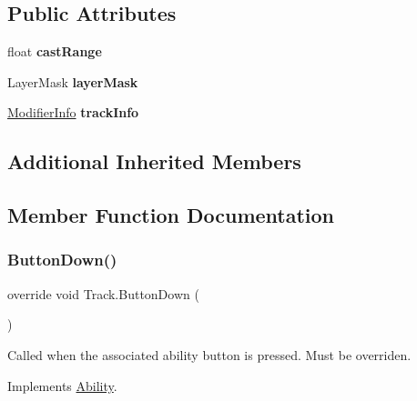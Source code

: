 \subsection*{Public Attributes}
\begin{DoxyCompactItemize}
\item 
\hypertarget{class_track_a17804c52c91aeb0228e837b6e31c950d}{}\label{class_track_a17804c52c91aeb0228e837b6e31c950d} 
float {\bfseries cast\+Range}
\item 
\hypertarget{class_track_addd810a1cef17f4a983aa4c35be2fb28}{}\label{class_track_addd810a1cef17f4a983aa4c35be2fb28} 
Layer\+Mask {\bfseries layer\+Mask}
\item 
\hypertarget{class_track_a2c1676d7c01b64a7427260e8376dafa3}{}\label{class_track_a2c1676d7c01b64a7427260e8376dafa3} 
\hyperlink{struct_modifier_info}{Modifier\+Info} {\bfseries track\+Info}
\end{DoxyCompactItemize}
\subsection*{Additional Inherited Members}


\subsection{Member Function Documentation}
\hypertarget{class_track_a3f8061a940df45c78ce92a81abde7af5}{}\label{class_track_a3f8061a940df45c78ce92a81abde7af5} 
\subsubsection{\texorpdfstring{Button\+Down()}{ButtonDown()}}
{\footnotesize\ttfamily override void Track.\+Button\+Down (\begin{DoxyParamCaption}{ }\end{DoxyParamCaption})\hspace{0.3cm}{\ttfamily [virtual]}}



Called when the associated ability button is pressed. Must be overriden. 



Implements \hyperlink{class_ability_a7722265862f8b29828315725415ce266}{Ability}.

\hypertarget{class_track_a87f3127370608a55c44203b8551e01e4}{}\label{class_track_a87f3127370608a55c44203b8551e01e4} 
